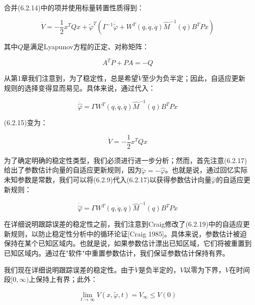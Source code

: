 \documentclass[12pt,a4paper]{ctexart}
\begin{document}
合并(6.2.14)中的项并使用标量转置性质得到：

\begin{equation}\label{eq:lyapunov-combined}
\dot{V} = -\frac{1}{2} x^T Q x + \tilde{\varphi}^T \left( \Gamma^{-1} \dot{\tilde{\varphi}} + W^T(q, \dot{q}, \ddot{q}) \hat{M}^{-1}(q) B^T P x \right)
\end{equation}

其中$Q$是满足Lyapunov方程的正定、对称矩阵：

\begin{equation}\label{eq:lyapunov-eq}
A^T P + PA = -Q
\end{equation}

从第1章我们注意到，为了稳定性，总是希望$\dot{V}$至少为负半定；因此，自适应更新规则的选择变得显而易见。具体来说，通过代入：

\begin{equation}\label{eq:update-rule}
\dot{\hat{\varphi}} = \Gamma W^T(q, \dot{q}, \ddot{q}) \hat{M}^{-1}(q) B^T P x
\end{equation}

(6.2.15)变为：

\begin{equation}\label{eq:lyapunov-negative}
\dot{V} = -\frac{1}{2} x^T Q x
\end{equation}

为了确定明确的稳定性类型，我们必须进行进一步分析；然而，首先注意(6.2.17)给出了参数估计向量的自适应更新规则，因为$\dot{\tilde{\varphi}} = -\dot{\hat{\varphi}}$。也就是说，通过回忆实际未知参数是常数，我们可以将(6.2.9)代入(6.2.17)以获得参数估计向量$\hat{\varphi}$的自适应更新规则：

\begin{equation}\label{eq:adaptive-update}
\dot{\hat{\varphi}} = \Gamma W^T(q, \dot{q}, \ddot{q}) \hat{M}^{-1}(q) B^T P x
\end{equation}

在详细说明跟踪误差的稳定性之前，我们注意到Craig修改了(6.2.19)中的自适应更新规则，以防止稳定性分析中的循环论证[Craig 1985]。具体来说，参数估计被迫保持在某个已知区域内。也就是说，如果参数估计漂出已知区域，它们将被重置到已知区域内。通过在"软件"中重置参数估计，我们保证参数估计保持有界。

我们现在详细说明跟踪误差的稳定性。由于$\dot{V}$是负半定的，$V$以零为下界，$V$在时间段$[0, \infty)$上保持上有界；此外：

\begin{equation}
\lim_{t \to \infty} V(x, \tilde{\varphi}, t) = V_\infty \leq V(0)
\end{equation}
\end{document}
